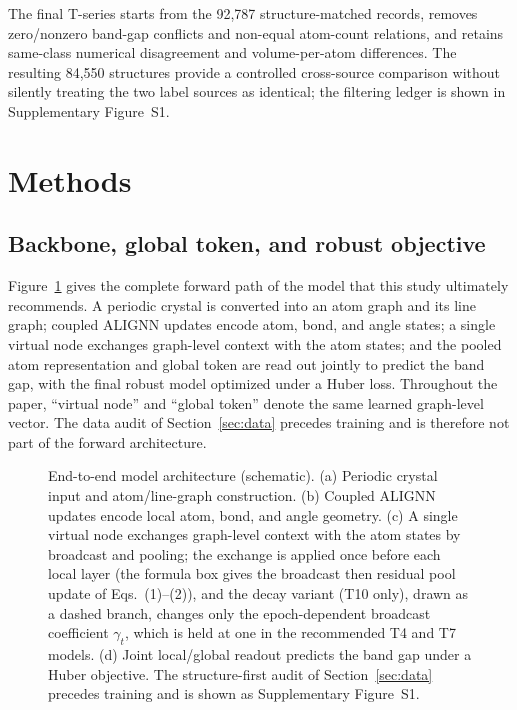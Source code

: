 \documentclass[a4paper,11pt]{article}
\begin{document}
The final T-series starts from the 92,787 structure-matched records, removes zero/nonzero band-gap conflicts and non-equal atom-count relations, and retains same-class numerical disagreement and volume-per-atom differences. The resulting 84,550 structures provide a controlled cross-source comparison without silently treating the two label sources as identical; the filtering ledger is shown in Supplementary Figure~S1.

\section{Methods}

\subsection{Backbone, global token, and robust objective}

Figure~\ref{fig:architecture} gives the complete forward path of the model that this study ultimately recommends. A periodic crystal is converted into an atom graph and its line graph; coupled ALIGNN updates encode atom, bond, and angle states; a single virtual node exchanges graph-level context with the atom states; and the pooled atom representation and global token are read out jointly to predict the band gap, with the final robust model optimized under a Huber loss. Throughout the paper, ``virtual node'' and ``global token'' denote the same learned graph-level vector. The data audit of Section~\ref{sec:data} precedes training and is therefore not part of the forward architecture.

\begin{figure}[htbp]
\centering
\resizebox{\textwidth}{!}{}
\caption{End-to-end model architecture (schematic). (a) Periodic crystal input and atom/line-graph construction. (b) Coupled ALIGNN updates encode local atom, bond, and angle geometry. (c) A single virtual node exchanges graph-level context with the atom states by broadcast and pooling; the exchange is applied once before each local layer (the formula box gives the broadcast then residual pool update of Eqs.~(1)--(2)), and the decay variant (T10 only), drawn as a dashed branch, changes only the epoch-dependent broadcast coefficient \(\gamma_t\), which is held at one in the recommended T4 and T7 models. (d) Joint local/global readout predicts the band gap under a Huber objective. The structure-first audit of Section~\ref{sec:data} precedes training and is shown as Supplementary Figure~S1.}
\label{fig:architecture}
\end{figure}
\end{document}
